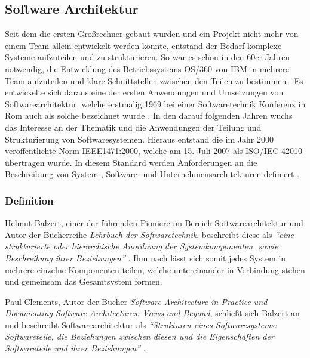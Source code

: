 \subsection{Software Architektur}

Seit dem die ersten Großrechner gebaut wurden und ein Projekt nicht mehr von einem Team allein entwickelt werden konnte, entstand der Bedarf komplexe Systeme aufzuteilen und zu strukturieren. So war es schon in den 60er Jahren notwendig, die Entwicklung des  Betriebssystems OS/360 von IBM in mehrere Team aufzuteilen und klare Schnittstellen zwischen den Teilen zu bestimmen \parencite{brooks_mythical_1995}. Es entwickelte sich daraus eine der ersten Anwendungen und Umsetzungen von  Softwarearchitektur, welche erstmalig 1969 bei einer Softwaretechnik Konferenz in Rom auch als solche bezeichnet wurde \parencite[vgl.][S. 12]{buxton_software_1970}. In den darauf folgenden Jahren wuchs das Interesse an der Thematik und die Anwendungen der Teilung und Strukturierung von Softwaresystemen.
Hieraus entstand die im Jahr 2000 veröffentlichte Norm IEEE1471:2000, welche am 15. Juli 2007 als  ISO/IEC  42010 übertragen wurde. In diesem Standard werden Anforderungen an die Beschreibung von System-, Software- und Unternehmensarchitekturen definiert \parencite{hilliard_isoiecieee_nodate}.

\subsubsection{Definition}


Helmut Balzert, einer der führenden Pioniere im Bereich Softwarearchitektur und Autor der Bücherreihe \textit{Lehrbuch der Softwaretechnik}, beschreibt diese als \textit{\enquote{eine strukturierte oder hierarchische Anordnung der Systemkomponenten, sowie Beschreibung ihrer Beziehungen}} \parencite[][S. 580]{balzert_lehrbuch_2011}. Ihm nach lässt sich somit jedes System in mehrere einzelne Komponenten teilen, welche untereinander in Verbindung stehen und gemeinsam das Gesamtsystem formen.

Paul Clements, Autor der Bücher \textit{Software Architecture in Practice und Documenting Software Architectures: Views and Beyond}, schließt sich Balzert an und beschreibt Softwarearchitektur als \textit{\enquote{Strukturen eines Softwaresystems: Softwareteile, die Beziehungen zwischen diesen und die Eigenschaften der Softwareteile und ihrer Beziehungen}} \parencite[][S. 23]{clements_documenting_2010}.

